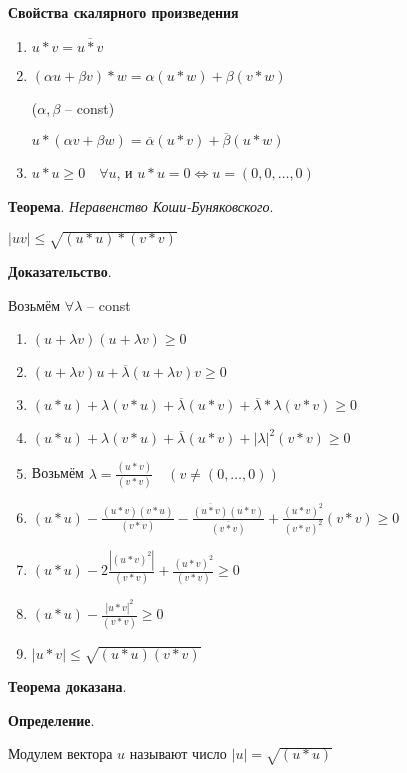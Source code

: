 \documentclass{article}
\newcommand{\parspace}{\vspace{10pt}}
\begin{document}
\textbf{Свойства скалярного произведения}
\begin{enumerate}
    \item $u * v = \overline{u * v}$
    \item $(\alpha u + \beta v) * w = \alpha (u * w) + \beta (v * w)$

    ($\alpha, \beta$ -- const)

    $u * (\alpha v + \beta w) = \overline{\alpha} (u * v) + \overline{\beta} (u * w)$

    \item $u * u \ge 0 \quad \forall u$, и $u * u = 0 \Leftrightarrow u = (0,0,\dots,0)$
\end{enumerate}

\parspace

\textbf{Теорема}. \textit{Неравенство Коши-Буняковского}.

$|u v| \le \sqrt{(u * u) * (v * v)}$

\textbf{Доказательство}.

Возьмём $\forall \lambda $ -- const

\begin{enumerate}
    \item $(u + \lambda v) (u + \lambda v) \ge 0$
    \item $(u + \lambda v) u + \overline{\lambda} (u + \lambda v) v \ge 0$
    \item $(u * u) + \lambda (v * u) + \overline{\lambda} (u * v) + \overline{\lambda} * \lambda (v * v) \ge 0$
    \item $(u * u) + \lambda (v * u) + \overline{\lambda} (u * v) + |\lambda|^2 (v * v) \ge 0$
    \item Возьмём $\lambda = \frac{(u * v)}{(v * v)} \quad (v \neq (0, \dots, 0))$
    \item $(u * u) - \frac{(u * v) (v * u)}{(v * v)} - \frac{\overline{(u * v)} (u * v)}{\overline{(v * v)}}
    + \frac{(u * v)^2}{(v * v)^2} (v * v) \ge 0$
    \item $(u * u) - 2 \frac{|(u * v)^2|}{(v * v)} + \frac{(u * v)^2}{(v * v)} \ge 0$
    \item $(u * u) - \frac{|u * v|^2}{(v * v)} \ge 0$
    \item $|u * v| \le \sqrt{(u * u) (v * v)}$
\end{enumerate}

\textbf{Теорема доказана}.

\parspace

\textbf{Определение}.

Модулем вектора $u$ называют число $|u| = \sqrt{(u * u)}$
\end{document}
